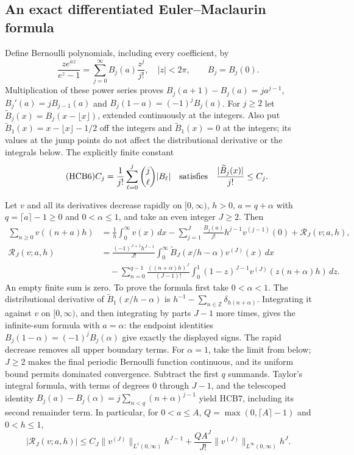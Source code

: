\subsection{An exact differentiated Euler--Maclaurin formula}

Define Bernoulli polynomials, including every coefficient, by
\begin{equation}\tag{HCB5}
 \frac{z e^{a z}}{e^z-1}=\sum_{j=0}^{\infty}B_j(a)\frac{z^j}{j!},
 \quad |z|<2\pi,\qquad B_j=B_j(0).
\end{equation}
Multiplication of these power series proves
$B_j(a+1)-B_j(a)=j a^{j-1}$,
$B_j'(a)=jB_{j-1}(a)$ and
$B_j(1-a)=(-1)^jB_j(a)$. For $j\geq2$ let
$\widetilde B_j(x)=B_j(x-\lfloor x\rfloor)$, extended continuously
at the integers. Also put
$\widetilde B_1(x)=x-\lfloor x\rfloor-1/2$ off the integers and
$\widetilde B_1(x)=0$ at the integers; its values at the jump points
do not affect the distributional derivative or the integrals below.
The explicitly finite constant
\begin{equation}\tag{HCB6}
 C_j=\frac1{j!}\sum_{\ell=0}^j\binom j\ell |B_\ell|
 \quad\hbox{satisfies}\quad
 \frac{|\widetilde B_j(x)|}{j!}\leq C_j.
\end{equation}

Let $v$ and all its derivatives decrease rapidly on $[0,\infty)$,
$h>0$, $a=q+\alpha$ with $q=\lceil a\rceil-1\geq0$ and
$0<\alpha\leq1$, and take an even integer $J\geq2$. Then
\begin{equation}\tag{HCB7}
\begin{split}
 \sum_{n\geq0}v((n+a)h)
 &=\frac1h\int_0^\infty v(x)\,dx
   -\sum_{j=1}^{J}\frac{B_j(a)}{j!}h^{j-1}v^{(j-1)}(0)
   +\mathcal R_J(v;a,h),\\
 \mathcal R_J(v;a,h)
 &=\frac{(-1)^{J+1}h^{J-1}}{J!}
       \int_0^\infty\widetilde B_J(x/h-\alpha)v^{(J)}(x)\,dx\\
 &\quad-\sum_{n=0}^{q-1}\frac{((n+\alpha)h)^J}{(J-1)!}
       \int_0^1(1-z)^{J-1}v^{(J)}(z(n+\alpha)h)\,dz.
\end{split}
\end{equation}
An empty finite sum is zero. To prove the formula first take
$0<\alpha<1$. The distributional derivative of
$\widetilde B_1(x/h-\alpha)$ is
$h^{-1}-\sum_{n\in\mathbb Z}\delta_{h(n+\alpha)}$.
Integrating it against $v$ on $[0,\infty)$, and then integrating
by parts $J-1$ more times, gives the infinite-sum formula with
$a=\alpha$: the endpoint identities
$B_j(1-\alpha)=(-1)^jB_j(\alpha)$ give exactly the displayed signs.
The rapid decrease removes all upper boundary terms. For
$\alpha=1$, take the limit from below; $J\geq2$ makes the final
periodic Bernoulli function continuous, and its uniform bound
permits dominated convergence. Subtract the first $q$ summands.
Taylor's integral formula, with terms of degrees $0$ through
$J-1$, and the telescoped identity
$B_j(a)-B_j(\alpha)=j\sum_{n<q}(n+\alpha)^{j-1}$ yield HCB7,
including its second remainder term. In particular, for $0<a\leq A$,
$Q=\max(0,\lceil A\rceil-1)$ and $0<h\leq1$,
\begin{equation}\tag{HCB8}
 |\mathcal R_J(v;a,h)|\leq
 C_J\|v^{(J)}\|_{L^1(0,\infty)}h^{J-1}
 +\frac{Q A^J}{J!}\|v^{(J)}\|_{L^\infty(0,\infty)}h^J.
\end{equation}

